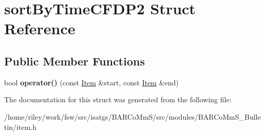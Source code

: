 \hypertarget{structsort_by_time_c_f_d_p2}{}\section{sort\+By\+Time\+C\+F\+D\+P2 Struct Reference}
\label{structsort_by_time_c_f_d_p2}
\subsection*{Public Member Functions}
\begin{DoxyCompactItemize}
\item 
bool {\bfseries operator()} (const \hyperlink{class_item}{Item} \&start, const \hyperlink{class_item}{Item} \&end)\hypertarget{structsort_by_time_c_f_d_p2_a8a53b8e3f6621e8c224bb82c84435def}{}\label{structsort_by_time_c_f_d_p2_a8a53b8e3f6621e8c224bb82c84435def}

\end{DoxyCompactItemize}


The documentation for this struct was generated from the following file\+:\begin{DoxyCompactItemize}
\item 
/home/riley/work/fsw/src/isatgs/\+B\+A\+R\+Co\+Mm\+S/src/modules/\+B\+A\+R\+Co\+Mm\+S\+\_\+\+Bulletin/item.\+h\end{DoxyCompactItemize}
